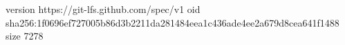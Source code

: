 version https://git-lfs.github.com/spec/v1
oid sha256:1f0696ef727005b86d3b2211da281484eea1c436ade4ee2a679d8cea641f1488
size 7278

